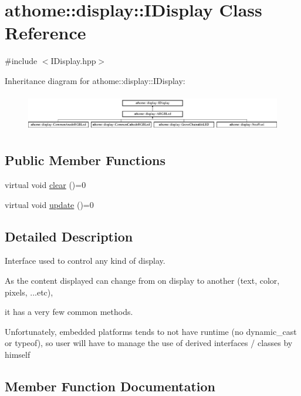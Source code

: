 \hypertarget{classathome_1_1display_1_1_i_display}{}\section{athome\+:\+:display\+:\+:I\+Display Class Reference}
\label{classathome_1_1display_1_1_i_display}


{\ttfamily \#include $<$I\+Display.\+hpp$>$}

Inheritance diagram for athome\+:\+:display\+:\+:I\+Display\+:\begin{figure}[H]
\begin{center}
\leavevmode
\includegraphics[height=1.660079cm]{classathome_1_1display_1_1_i_display}
\end{center}
\end{figure}
\subsection*{Public Member Functions}
\begin{DoxyCompactItemize}
\item 
virtual void \mbox{\hyperlink{classathome_1_1display_1_1_i_display_a0d3add1ce61c96657827fb56d250d9c6}{clear}} ()=0
\item 
virtual void \mbox{\hyperlink{classathome_1_1display_1_1_i_display_a4ba7bd5d46f88578f1c846f4f5f3c5d1}{update}} ()=0
\end{DoxyCompactItemize}


\subsection{Detailed Description}
Interface used to control any kind of display.

As the content displayed can change from on display to another (text, color, pixels, ...etc),

it has a very few common methods.

Unfortunately, embedded platforms tends to not have runtime (no {\ttfamily dynamic\+\_\+cast} or {\ttfamily typeof}), so user will have to manage the use of derived interfaces / classes by himself 

\subsection{Member Function Documentation}
\mbox{\label{classathome_1_1display_1_1_i_display_a0d3add1ce61c96657827fb56d250d9c6}} 

